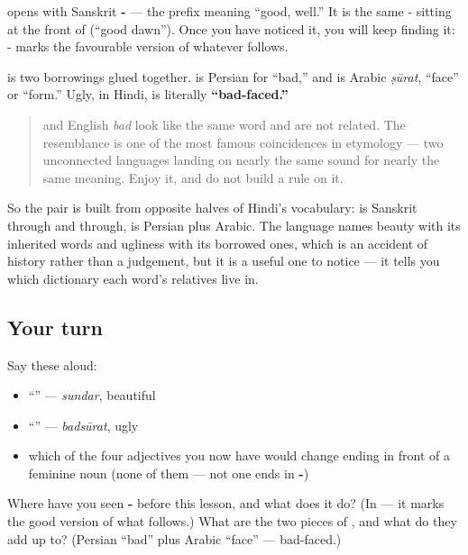 \begin{cousinweb}
\textbf{} opens with Sanskrit \textbf{-} — the prefix meaning \textquotedblleft{}good, well.\textquotedblright{} It is the same - sitting at the front of \textbf{} (\textquotedblleft{}good dawn\textquotedblright{}). Once you have noticed it, you will keep finding it: - marks the favourable version of whatever follows.

\textbf{} is two borrowings glued together. \textbf{} is Persian for \textquotedblleft{}bad,\textquotedblright{} and \textbf{} is Arabic \emph{ṣūrat}, \textquotedblleft{}face\textquotedblright{} or \textquotedblleft{}form.\textquotedblright{} Ugly, in Hindi, is literally \textbf{\textquotedblleft{}bad-faced.\textquotedblright{}}

\begin{quote}
\textbf{} and English \emph{bad} look like the same word and are not related. The resemblance is one of the most famous coincidences in etymology — two unconnected languages landing on nearly the same sound for nearly the same meaning. Enjoy it, and do not build a rule on it.
\end{quote}

So the pair is built from opposite halves of Hindi's vocabulary:  is Sanskrit through and through,  is Persian plus Arabic. The language names beauty with its inherited words and ugliness with its borrowed ones, which is an accident of history rather than a judgement, but it is a useful one to notice — it tells you which dictionary each word's relatives live in.
\end{cousinweb}

\subsection*{Your turn}
Say these aloud:

\begin{itemize}
\raggedright
  \item \textquotedblleft{}\textquotedblright{} — \emph{sundar}, beautiful
  \item \textquotedblleft{}\textquotedblright{} — \emph{badsūrat}, ugly
  \item which of the four adjectives you now have would change ending in front of a feminine noun (none of them — not one ends in \textbf{-})
\end{itemize}

\begin{tcolorbox}[breakable,colback=teal!4,colframe=teal!35!black,title={Before you move on}]
Where have you seen \textbf{-} before this lesson, and what does it do? (In \textbf{} — it marks the good version of what follows.) What are the two pieces of \textbf{}, and what do they add up to? (Persian \textbf{} \textquotedblleft{}bad\textquotedblright{} plus Arabic \textbf{} \textquotedblleft{}face\textquotedblright{} — bad-faced.)
\end{tcolorbox}
